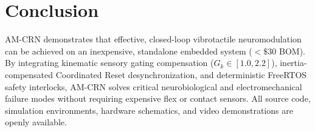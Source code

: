 \documentclass[10pt,twocolumn]{article}
\begin{document}
\section*{Conclusion}
AM-CRN demonstrates that effective, closed-loop vibrotactile neuromodulation can be achieved on an inexpensive, standalone embedded system ($<\$30$ BOM). By integrating kinematic sensory gating compensation ($G_k \in [1.0, 2.2]$), inertia-compensated Coordinated Reset desynchronization, and deterministic FreeRTOS safety interlocks, AM-CRN solves critical neurobiological and electromechanical failure modes without requiring expensive flex or contact sensors. All source code, simulation environments, hardware schematics, and video demonstrations are openly available.

\begingroup
\footnotesize


\endgroup
\end{document}
